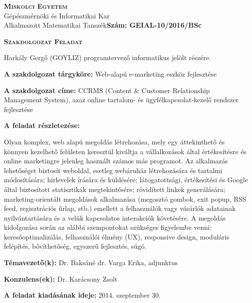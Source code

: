 \begin{flushleft}
\textsc{\bfseries Miskolci Egyetem}\\
Gépészmérnöki és Informatikai Kar\\
Alkalmazott Matematikai Tanszék\hspace*{3cm}\hfil \textbf{Szám: GEIAL-10/2016/BSc}
\end{flushleft}
\vskip 0.5cm
\begin{center}
\large\textsc{\bfseries Szakdolgozat Feladat}
\end{center}
\vskip 0.5cm
Harkály Gergő (GOYLIZ) programtervező informatikus jelölt részére.\newline

\noindent\textbf{A szakdolgozat tárgyköre:} Web-alapú e-marketing eszköz fejlesztése\newline

\noindent\textbf{A szakdolgozat címe:} CCRMS (Content \& Customer Relationship Management System), azaz online tartalom- és ügyfélkapcsolat-kezelő rendszer fejlesztése\newline

\noindent\textbf{A feladat részletezése:}

\noindent Olyan komplex, web alapú megoldás létrehozása, mely egy áttekinthető és könnyen kezelhető felületen keresztül kiváltja a vállalkozások által értékesítésre és online marketingre jelenleg használt számos más programot. Az alkalmazás lehetőséget biztosít weboldal, esetleg webáruház létrehozására és tartalmi módosítására; hírlevelek írására és küldésére; látogatottsági, értékesítési és Google által biztosított statisztikák megtekintésére; rövidített linkek generálására; marketing-orientált megoldások alkalmazása (megosztó gombok, exit popup, RSS feed, regisztrációs űrlap, stb.) emellett a felhasználók vagy vásárlók adatainak nyilvántartására és a velük kapcsolatos interakciók követésére. A megoldás kidolgozása során az alábbi szempontokat szükséges figyelembe venni: keresőoptimalizálás, felhasználói élmény (UX), responsive design, moduláris felépítés, bővíthetőség, egyszerű fejlesztés, súgó.

\vfill

\noindent\textbf{Témavezető(k):} Dr. Baksáné dr. Varga Erika, adjunktus\newline

\noindent\textbf{Konzulens(ek):} Dr. Karácsony Zsolt\newline

\noindent\textbf{A feladat kiadásának ideje:} 2014. szeptember 30. \newline

